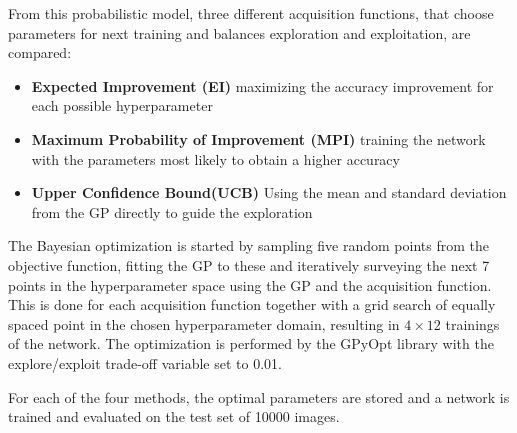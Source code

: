 \documentclass[12pt,fleqn]{article}
\begin{document}
\begin{multicols}{2}
From this probabilistic model, three different acquisition functions, that choose parameters for next training and balances exploration and exploitation, are compared:

\begin{itemize}
	\item \textbf{Expected Improvement (EI)} maximizing the accuracy improvement for each possible hyperparameter
	\item \textbf{Maximum Probability of Improvement (MPI)} training the network with the parameters most likely to obtain a higher accuracy
	\item \textbf{Upper Confidence Bound(UCB)} Using the mean and standard deviation from the GP directly to guide the exploration
\end{itemize}
The Bayesian optimization is started by sampling five random points from the objective function, fitting the GP to these and iteratively surveying the next 7 points in the hyperparameter space using the GP and the acquisition function. This is done for each acquisition function together with a grid search of equally spaced point in the chosen hyperparameter domain, resulting in \(4\times12\) trainings of the network. The optimization is performed by the GPyOpt library \cite{gpyopt} with the  explore/exploit trade-off variable set to 0.01.

For each of the four methods, the optimal parameters are stored and a network is trained and evaluated on the test set of 10000 images.

\end{multicols}
\vspace*{-0.3cm}
\end{document}
